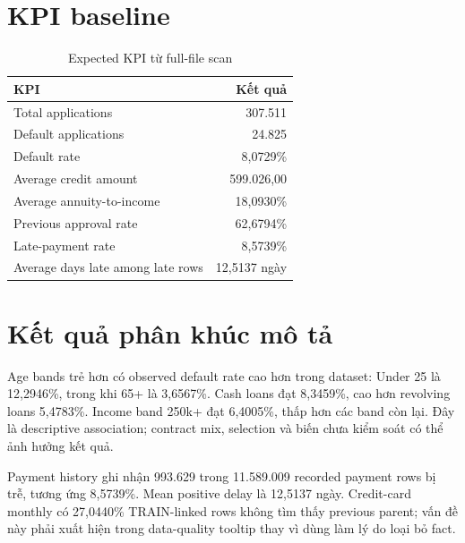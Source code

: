 \documentclass[12pt,a4paper,oneside]{report}
\begin{document}
\section{KPI baseline}
\begin{table}[H]
\centering
\caption{Expected KPI từ full-file scan}\label{tab:kpi}
\begin{tabular}{lr}
\toprule
KPI & Kết quả \\
\midrule
Total applications & 307.511 \\
Default applications & 24.825 \\
Default rate & 8,0729\% \\
Average credit amount & 599.026,00 \\
Average annuity-to-income & 18,0930\% \\
Previous approval rate & 62,6794\% \\
Late-payment rate & 8,5739\% \\
Average days late among late rows & 12,5137 ngày \\
\bottomrule
\end{tabular}
\end{table}

\section{Kết quả phân khúc mô tả}
Age bands trẻ hơn có observed default rate cao hơn trong dataset: Under 25 là 12,2946\%, trong khi 65+ là 3,6567\%. Cash loans đạt 8,3459\%, cao hơn revolving loans 5,4783\%. Income band 250k+ đạt 6,4005\%, thấp hơn các band còn lại. Đây là descriptive association; contract mix, selection và biến chưa kiểm soát có thể ảnh hưởng kết quả.

Payment history ghi nhận 993.629 trong 11.589.009 recorded payment rows bị trễ, tương ứng 8,5739\%. Mean positive delay là 12,5137 ngày. Credit-card monthly có 27,0440\% TRAIN-linked rows không tìm thấy previous parent; vấn đề này phải xuất hiện trong data-quality tooltip thay vì dùng làm lý do loại bỏ fact.
\end{document}
